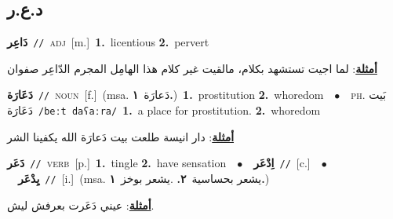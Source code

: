 \documentclass[10pt,a4paper,twoside]{article} %
\begin{document}
\begin{multicols}{2}
\vspace{-3mm}
\subsection*{\color{blue}\foreignlanguage{arabic}{د.ع.ر}\color{blue}{}} 

{\setlength\topsep{0pt}\textbf{\foreignlanguage{arabic}{دَاعِر}}\ {\color{gray}\texttt{//}\color{black}}\ \textsc{adj}\ [m.]\ \textbf{1.}~licentious  \textbf{2.}~pervert\  \begin{flushright}\color{gray}\foreignlanguage{arabic}{\textbf{\underline{\foreignlanguage{arabic}{أمثلة}}}: لما اجيت تستشهد بكلام، مالقيت غير كلام هذا الهامِل المجرم الدّاعِر صفوان}\end{flushright}\color{black}} \vspace{2mm}

{\setlength\topsep{0pt}\textbf{\foreignlanguage{arabic}{دَعَارَة}}\ {\color{gray}\texttt{//}\color{black}}\ \textsc{noun}\ [f.]\ \color{gray}(msa. \foreignlanguage{arabic}{دَعارَة}~\foreignlanguage{arabic}{\textbf{١.}})\color{black}\ \textbf{1.}~prostitution  \textbf{2.}~whoredom\ \ $\bullet$\ \ \textsc{ph.} \color{gray} \foreignlanguage{arabic}{بَيت دَعَارَة}\color{black}\ {\color{gray}\texttt{/{\sffamily beːt daʕaːra}/}\color{black}}\ \textbf{1.}~a place for prostitution.  \textbf{2.}~whoredom\  \begin{flushright}\color{gray}\foreignlanguage{arabic}{\textbf{\underline{\foreignlanguage{arabic}{أمثلة}}}: دار انيسة طلعت بيت دَعارَة الله يكفينا الشر}\end{flushright}\color{black}} \vspace{2mm}

{\setlength\topsep{0pt}\textbf{\foreignlanguage{arabic}{دَعَر}}\ {\color{gray}\texttt{//}\color{black}}\ \textsc{verb}\ [p.]\ \textbf{1.}~tingle  \textbf{2.}~have sensation\ \ $\bullet$\ \ \setlength\topsep{0pt}\textbf{\foreignlanguage{arabic}{اِدْعَر}}\ {\color{gray}\texttt{//}\color{black}}\ [c.]\ \ $\bullet$\ \ \setlength\topsep{0pt}\textbf{\foreignlanguage{arabic}{يِدْعَر}}\ {\color{gray}\texttt{//}\color{black}}\ [i.]\ \color{gray}(msa. \foreignlanguage{arabic}{يشعر بحساسية}~\foreignlanguage{arabic}{\textbf{٢.}}  .\foreignlanguage{arabic}{يشعر بوخز}~\foreignlanguage{arabic}{\textbf{١.}})\color{black}\  \begin{flushright}\color{gray}\foreignlanguage{arabic}{\textbf{\underline{\foreignlanguage{arabic}{أمثلة}}}: عيني دَعَرت بعرفش ليش.}\end{flushright}\color{black}} \vspace{2mm}


\end{multicols}
\end{document}
